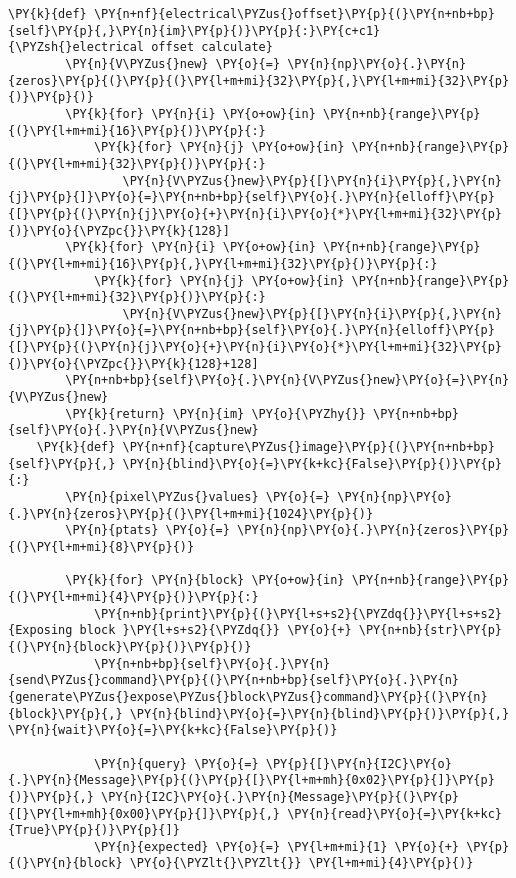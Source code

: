 \begin{tcolorbox}[breakable, size=fbox, boxrule=1pt, pad at break*=1mm,colback=cellbackground, colframe=cellborder]
\begin{Verbatim}[commandchars=\\\{\}]
	\PY{k}{def} \PY{n+nf}{electrical\PYZus{}offset}\PY{p}{(}\PY{n+nb+bp}{self}\PY{p}{,}\PY{n}{im}\PY{p}{)}\PY{p}{:}\PY{c+c1}{\PYZsh{}electrical offset calculate}
        \PY{n}{V\PYZus{}new} \PY{o}{=} \PY{n}{np}\PY{o}{.}\PY{n}{zeros}\PY{p}{(}\PY{p}{(}\PY{l+m+mi}{32}\PY{p}{,}\PY{l+m+mi}{32}\PY{p}{)}\PY{p}{)}
	    \PY{k}{for} \PY{n}{i} \PY{o+ow}{in} \PY{n+nb}{range}\PY{p}{(}\PY{l+m+mi}{16}\PY{p}{)}\PY{p}{:}
	        \PY{k}{for} \PY{n}{j} \PY{o+ow}{in} \PY{n+nb}{range}\PY{p}{(}\PY{l+m+mi}{32}\PY{p}{)}\PY{p}{:}
                \PY{n}{V\PYZus{}new}\PY{p}{[}\PY{n}{i}\PY{p}{,}\PY{n}{j}\PY{p}{]}\PY{o}{=}\PY{n+nb+bp}{self}\PY{o}{.}\PY{n}{elloff}\PY{p}{[}\PY{p}{(}\PY{n}{j}\PY{o}{+}\PY{n}{i}\PY{o}{*}\PY{l+m+mi}{32}\PY{p}{)}\PY{o}{\PYZpc{}}\PY{k}{128}]
	    \PY{k}{for} \PY{n}{i} \PY{o+ow}{in} \PY{n+nb}{range}\PY{p}{(}\PY{l+m+mi}{16}\PY{p}{,}\PY{l+m+mi}{32}\PY{p}{)}\PY{p}{:}
	        \PY{k}{for} \PY{n}{j} \PY{o+ow}{in} \PY{n+nb}{range}\PY{p}{(}\PY{l+m+mi}{32}\PY{p}{)}\PY{p}{:}
                \PY{n}{V\PYZus{}new}\PY{p}{[}\PY{n}{i}\PY{p}{,}\PY{n}{j}\PY{p}{]}\PY{o}{=}\PY{n+nb+bp}{self}\PY{o}{.}\PY{n}{elloff}\PY{p}{[}\PY{p}{(}\PY{n}{j}\PY{o}{+}\PY{n}{i}\PY{o}{*}\PY{l+m+mi}{32}\PY{p}{)}\PY{o}{\PYZpc{}}\PY{k}{128}+128]
        \PY{n+nb+bp}{self}\PY{o}{.}\PY{n}{V\PYZus{}new}\PY{o}{=}\PY{n}{V\PYZus{}new}
		\PY{k}{return} \PY{n}{im} \PY{o}{\PYZhy{}} \PY{n+nb+bp}{self}\PY{o}{.}\PY{n}{V\PYZus{}new}
	\PY{k}{def} \PY{n+nf}{capture\PYZus{}image}\PY{p}{(}\PY{n+nb+bp}{self}\PY{p}{,} \PY{n}{blind}\PY{o}{=}\PY{k+kc}{False}\PY{p}{)}\PY{p}{:}
		\PY{n}{pixel\PYZus{}values} \PY{o}{=} \PY{n}{np}\PY{o}{.}\PY{n}{zeros}\PY{p}{(}\PY{l+m+mi}{1024}\PY{p}{)}
		\PY{n}{ptats} \PY{o}{=} \PY{n}{np}\PY{o}{.}\PY{n}{zeros}\PY{p}{(}\PY{l+m+mi}{8}\PY{p}{)}

		\PY{k}{for} \PY{n}{block} \PY{o+ow}{in} \PY{n+nb}{range}\PY{p}{(}\PY{l+m+mi}{4}\PY{p}{)}\PY{p}{:}
			\PY{n+nb}{print}\PY{p}{(}\PY{l+s+s2}{\PYZdq{}}\PY{l+s+s2}{Exposing block }\PY{l+s+s2}{\PYZdq{}} \PY{o}{+} \PY{n+nb}{str}\PY{p}{(}\PY{n}{block}\PY{p}{)}\PY{p}{)}
			\PY{n+nb+bp}{self}\PY{o}{.}\PY{n}{send\PYZus{}command}\PY{p}{(}\PY{n+nb+bp}{self}\PY{o}{.}\PY{n}{generate\PYZus{}expose\PYZus{}block\PYZus{}command}\PY{p}{(}\PY{n}{block}\PY{p}{,} \PY{n}{blind}\PY{o}{=}\PY{n}{blind}\PY{p}{)}\PY{p}{,} \PY{n}{wait}\PY{o}{=}\PY{k+kc}{False}\PY{p}{)}

			\PY{n}{query} \PY{o}{=} \PY{p}{[}\PY{n}{I2C}\PY{o}{.}\PY{n}{Message}\PY{p}{(}\PY{p}{[}\PY{l+m+mh}{0x02}\PY{p}{]}\PY{p}{)}\PY{p}{,} \PY{n}{I2C}\PY{o}{.}\PY{n}{Message}\PY{p}{(}\PY{p}{[}\PY{l+m+mh}{0x00}\PY{p}{]}\PY{p}{,} \PY{n}{read}\PY{o}{=}\PY{k+kc}{True}\PY{p}{)}\PY{p}{]}
			\PY{n}{expected} \PY{o}{=} \PY{l+m+mi}{1} \PY{o}{+} \PY{p}{(}\PY{n}{block} \PY{o}{\PYZlt{}\PYZlt{}} \PY{l+m+mi}{4}\PY{p}{)}


\end{Verbatim}
\end{tcolorbox}
